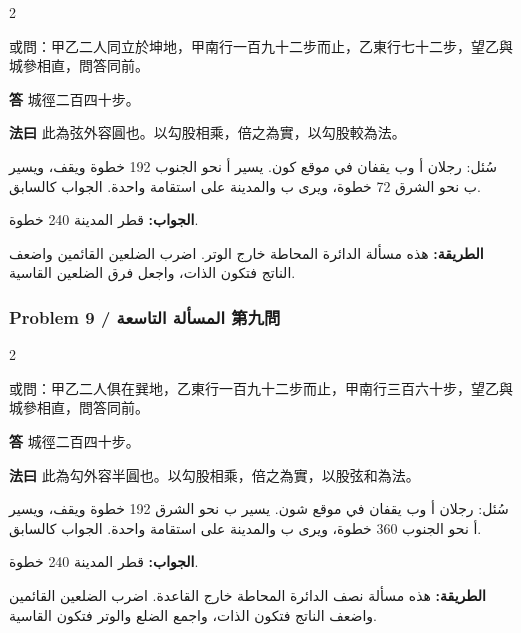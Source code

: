 \documentclass[11pt,a4paper]{article}
\newcommand{\ar}[1]{\arabicfont\beginR #1\endR}
\newcommand{\Answer}[1]{\par\noindent\textbf{\color{problemcolor}答} #1\par}
\newcommand{\Method}[1]{\par\noindent\textbf{\color{problemcolor}法曰} #1\par}
\newcommand{\AnswerAr}{\par\noindent\textbf{\color{problemcolor}\ar{الجواب:}} }
\newcommand{\MethodAr}{\par\noindent\textbf{\color{problemcolor}\ar{الطريقة:}} }
\begin{document}
\begin{paracol}{2}

\noindent 或問：甲乙二人同立於坤地，甲南行一百九十二步而止，乙東行七十二步，望乙與城參相直，問答同前。

\vspace{0.2cm}

\Answer{城徑二百四十步。}

\vspace{0.2cm}

\Method{此為弦外容圓也。以勾股相乘，倍之為實，以勾股較為法。}

\switchcolumn

\ar{سُئل: رجلان أ وب يقفان في موقع كون. يسير أ نحو الجنوب 192 خطوة ويقف، ويسير ب نحو الشرق 72 خطوة، ويرى ب والمدينة على استقامة واحدة. الجواب كالسابق.}

\vspace{0.2cm}

\AnswerAr{قطر المدينة 240 خطوة.}

\vspace{0.2cm}

\MethodAr{هذه مسألة الدائرة المحاطة خارج الوتر. اضرب الضلعين القائمين واضعف الناتج فتكون الذات، واجعل فرق الضلعين القاسية.}

\end{paracol}

\vspace{0.5cm}

\subsubsection*{Problem 9 / \ar{المسألة التاسعة} \quad 第九問}

\begin{paracol}{2}

\noindent 或問：甲乙二人俱在巽地，乙東行一百九十二步而止，甲南行三百六十步，望乙與城參相直，問答同前。

\vspace{0.2cm}

\Answer{城徑二百四十步。}

\vspace{0.2cm}

\Method{此為勾外容半圓也。以勾股相乘，倍之為實，以股弦和為法。}

\switchcolumn

\ar{سُئل: رجلان أ وب يقفان في موقع شون. يسير ب نحو الشرق 192 خطوة ويقف، ويسير أ نحو الجنوب 360 خطوة، ويرى ب والمدينة على استقامة واحدة. الجواب كالسابق.}

\vspace{0.2cm}

\AnswerAr{قطر المدينة 240 خطوة.}

\vspace{0.2cm}

\MethodAr{هذه مسألة نصف الدائرة المحاطة خارج القاعدة. اضرب الضلعين القائمين واضعف الناتج فتكون الذات، واجمع الضلع والوتر فتكون القاسية.}

\end{paracol}
\end{document}

